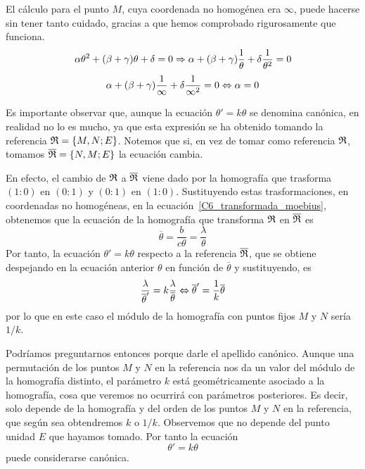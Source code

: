 \begin{obs}
	El cálculo para el punto $M$, cuya coordenada no homogénea era $\infty$, puede hacerse sin tener tanto cuidado, gracias a que hemos comprobado rigurosamente que funciona.
	\begin{equation*}
		\alpha\theta^2+(\beta+\gamma)\theta+\delta=0\Rightarrow\alpha+(\beta+\gamma)\frac{1}{\theta}+\delta\frac{1}{\theta^2}=0
	\end{equation*}
	\begin{equation*}
		\alpha+(\beta+\gamma)\frac{1}{\infty}+\delta\frac{1}{\infty^2}=0\Leftrightarrow \alpha=0
	\end{equation*}
\end{obs}
Es importante observar que, aunque la ecuación $\theta'=k\theta$ se denomina canónica, en realidad no lo es mucho, ya que esta expresión se ha obtenido tomando la referencia $\mathfrak{R}=\{M,N;E\}$. Notemos que si, en vez de tomar como referencia $\mathfrak{R}$, tomamos $\overline{\mathfrak{R}}=\{N,M;E\}$ la ecuación cambia.

En efecto, el cambio de $\mathfrak{R}$ a $\overline{\mathfrak{R}}$ viene dado por la homografía que trasforma $(1:0)$ en $(0:1)$ y $(0:1)$ en $(1:0)$. Sustituyendo estas trasformaciones, en coordenadas no homogéneas, en la ecuación~\eqref{C6_transformada_moebius}, obtenemos que la ecuación de la homografía que transforma $\mathfrak{R}$ en $\overline{\mathfrak{R}}$ es
\begin{equation*}
	\overline{\theta}=\frac{b}{c\theta}=\frac{\lambda}{\theta}
\end{equation*}
Por tanto, la ecuación $\theta'=k\theta$ respecto a la referencia $\overline{\mathfrak{R}}$, que se obtiene despejando en la ecuación anterior $\theta$ en función de $\overline{\theta}$ y sustituyendo, es
\begin{equation*}
	\frac{\lambda}{\overline{\theta}'}=k\frac{\lambda}{\overline{\theta}}\Leftrightarrow \overline{\theta}'=\frac{1}{k}\overline{\theta}
\end{equation*}
por lo que en este caso el módulo de la homografía con puntos fijos $M$ y $N$ sería $1/k$. 

Podríamos preguntarnos entonces porque darle el apellido canónico. Aunque una permutación de los puntos $M$ y $N$ en la referencia nos da un valor del módulo de la homografía distinto, el parámetro $k$ está geométricamente asociado a la homografía, cosa que veremos no ocurrirá con parámetros posteriores. Es decir, solo depende de la homografía y del orden de los puntos $M$ y $N$ en la referencia, que según sea obtendremos $k$ o $1/k$. Observemos que no depende del punto unidad $E$ que hayamos tomado. Por tanto la ecuación
\begin{equation}
	\label{C6_theta_ktheta}
	\theta'=k\theta
\end{equation}
puede considerarse canónica.

